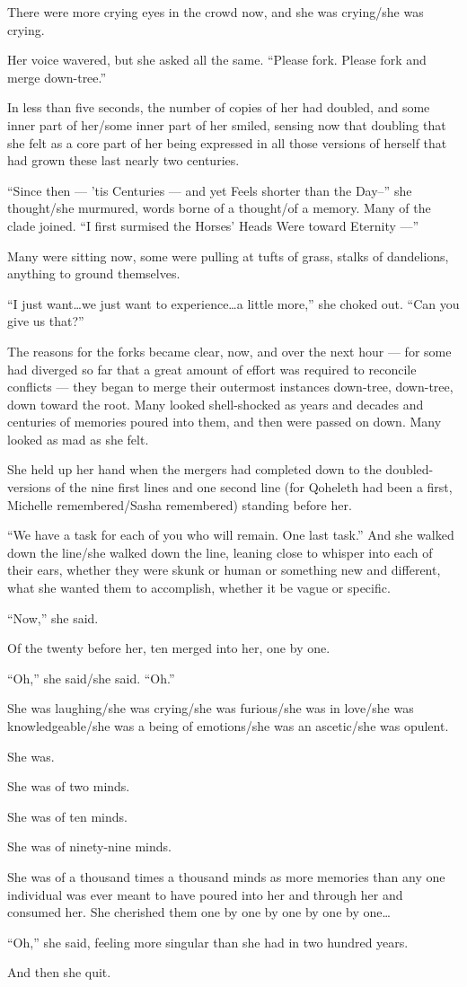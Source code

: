 There were more crying eyes in the crowd now, and she was crying/she was crying.

Her voice wavered, but she asked all the same. ``Please fork. Please fork and merge down-tree.''

In less than five seconds, the number of copies of her had doubled, and some inner part of her/some inner part of her smiled, sensing now that doubling that she felt as a core part of her being expressed in all those versions of herself that had grown these last nearly two centuries.

``Since then — 'tis Centuries — and yet Feels shorter than the Day--'' she thought/she murmured, words borne of a thought/of a memory. Many of the clade joined. ``I first surmised the Horses' Heads Were toward Eternity —''

Many were sitting now, some were pulling at tufts of grass, stalks of dandelions, anything to ground themselves.

``I just want\ldots we just want to experience\ldots a little more,'' she choked out. ``Can you give us that?''

The reasons for the forks became clear, now, and over the next hour — for some had diverged so far that a great amount of effort was required to reconcile conflicts — they began to merge their outermost instances down-tree, down-tree, down toward the root. Many looked shell-shocked as years and decades and centuries of memories poured into them, and then were passed on down. Many looked as mad as she felt.

She held up her hand when the mergers had completed down to the doubled-versions of the nine first lines and one second line (for Qoheleth had been a first, Michelle remembered/Sasha remembered) standing before her.

``We have a task for each of you who will remain. One last task.'' And she walked down the line/she walked down the line, leaning close to whisper into each of their ears, whether they were skunk or human or something new and different, what she wanted them to accomplish, whether it be vague or specific.

``Now,'' she said.

Of the twenty before her, ten merged into her, one by one.

``Oh,'' she said/she said. ``Oh.''

She was laughing/she was crying/she was furious/she was in love/she was knowledgeable/she was a being of emotions/she was an ascetic/she was opulent.

She was.

She was of two minds.

She was of ten minds.

She was of ninety-nine minds.

She was of a thousand times a thousand minds as more memories than any one individual was ever meant to have poured into her and through her and consumed her. She cherished them one by one by one by one by one\ldots{}

``Oh,'' she said, feeling more singular than she had in two hundred years.

And then she quit.
